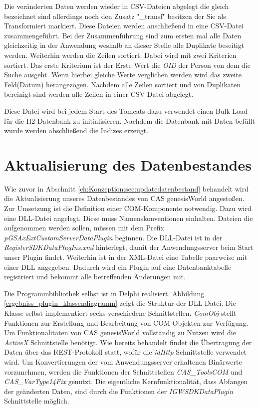 Die veränderten Daten werden wieder in CSV-Dateien abgelegt die gleich bezeichnet sind allerdings noch den Zusatz "\_transf" besitzen der Sie als Transformiert  markiert. Diese Dateien werden anschließend in eine CSV-Datei zusammengeführt. Bei der Zusammenführung sind zum ersten mal alle Daten gleichzeitig in der Anwendung weshalb an dieser Stelle alle Duplikate beseitigt werden. Weiterhin werden die Zeilen sortiert. Dabei wird mit zwei Kriterien sortiert. Das erste Kriterium ist der Erste Wert die \textit{OID} der Person von dem die Suche ausgeht. Wenn hierbei gleiche Werte verglichen werden wird das zweite Feld(Datum) herangezogen. Nachdem alle Zeilen sortiert und von Duplikaten bereinigt sind werden alle Zeilen in einer CSV-Datei abgelegt. 

Diese Datei wird bei jedem Start des Tomcats dazu verwendet einen Bulk-Load für die H2-Datenbank zu initialisieren. Nachdem die Datenbank mit Daten befüllt wurde werden abschließend die Indizes erzeugt.


\section{Aktualisierung des Datenbestandes}

Wie zuvor in Abschnitt \ref{ch:Konzeption:sec:updatedatenbestand} behandelt wird die Aktualisierung unseres Datenbestandes von CAS genesisWorld angestoßen. Zur Umsetzung ist die Definition einer COM-Komponente notwendig. Dazu wird eine DLL-Datei angelegt. Diese muss Namenskonventionen einhalten. Dateien die aufgenommen werden sollen, müssen mit dem Prefix \textit{pGSAxExtCustomServerDataPlugin} beginnen. Die DLL-Datei ist in der \textit{RegisterSDKDataPlugIns.xml} hinterlegt, damit der Anwendungsserver beim Start unser Plugin findet. Weiterhin ist in der XML-Datei eine Tabelle paarweise mit einer DLL angegeben. Dadurch wird ein Plugin auf eine Datenbanktabelle registriert und bekommt alle betreffenden Änderungen mit.

Die Programmbibliothek selbst ist in Delphi realisiert. Abbildung \ref{ergebniss_plugin_klassendiagramm} zeigt die Struktur der DLL-Datei. Die Klasse selbst implementiert sechs verschiedene Schnittstellen. \textit{ComObj} stellt Funktionen zur Erstellung und Bearbeitung von COM-Objekten zur Verfügung. Um Funktionalitäten von CAS genesisWorld vollständig zu Nutzen wird die \textit{ActiveX} Schnittstelle benötigt. Wie bereits behandelt findet die Übertragung der Daten über das REST-Protokoll statt, wofür die \textit{idHttp} Schnittstelle verwendet wird. Um Konvertierungen der vom Anwendungsserver erhaltenen Binärwerte vorzunehmen, werden die Funktionen der Schnittstellen \textit{CAS\_ToolsCOM} und \textit{CAS\_VarType14Fix} genutzt. Die eigentliche Kernfunktionalität, dass Abfangen der geänderten Daten, sind durch die Funktionen der \textit{IGWSDKDataPlugin} Schnittstelle möglich.

